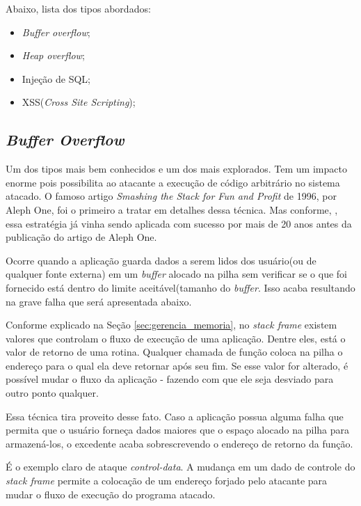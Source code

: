 		
		Abaixo, lista dos tipos abordados:
		\begin{itemize}
		 	\item{\textsl{Buffer overflow};}
			\item{\textsl{Heap overflow};}
			\item{Injeção de SQL;}
			\item{XSS(\textsl{Cross Site Scripting});}
		\end{itemize}

		\subsection{\textsl{Buffer Overflow}}
		\label{subsec:buffer_overflow}
			Um dos tipos mais bem conhecidos e um dos mais explorados. Tem um impacto
			enorme pois possibilita ao atacante a execução de código arbitrário no sistema atacado.
			O famoso artigo \textsl{Smashing the Stack for Fun and Profit} de 1996, por Aleph One,
			foi o primeiro a tratar em detalhes dessa técnica. Mas conforme, \cite{Anley2007},
			essa estratégia já vinha sendo aplicada com sucesso por mais de 20 anos antes da publicação
			do artigo de Aleph One.


			Ocorre quando a aplicação guarda dados a serem lidos dos usuário(ou de qualquer
			fonte externa) em um \textsl{buffer} alocado na pilha sem verificar
			se o que foi fornecido está dentro do limite aceitável(tamanho do \textsl{buffer}.
			Isso acaba resultando na grave falha que será apresentada abaixo.
			
			Conforme explicado na Seção \ref{sec:gerencia_memoria}, no \textsl{stack frame}
			existem valores que controlam o fluxo de execução de uma aplicação.
			Dentre eles, está o valor de retorno de uma rotina. Qualquer chamada de função
			coloca na pilha o endereço para o qual ela deve retornar após seu fim. Se esse
			valor for alterado, é possível mudar o fluxo da aplicação - fazendo
			com que ele seja desviado para outro ponto qualquer.
			

			Essa técnica tira proveito desse fato. Caso a aplicação possua alguma
			falha que permita que o usuário forneça dados maiores que o espaço
			alocado na pilha para armazená-los, o excedente acaba sobrescrevendo o
			endereço de retorno da função.
	

			É o exemplo claro de ataque \textsl{control-data}. A mudança em um dado
			de controle do \textsl{stack frame} permite a colocação de um endereço
			forjado pelo atacante para mudar o fluxo de execução do programa atacado.
			
